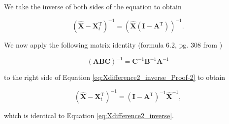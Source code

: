 \documentclass[authoryear,preprint,review,12pt]{elsarticle}
\let\oldhat\hat
\renewcommand{\vec}[1]{\mathbf{#1}}
\renewcommand{\hat}[1]{\oldhat{\mathbf{#1}}}
\begin{document}
\noindent We take the inverse of both sides of the equation to obtain

\begin{equation} \label{eq:Xdifference2_inverse_Proof-2}
	\left(\hat{\vec{X}} - \vec{X}_t^\mathrm{T}\right)^{-1} = \left(\hat{\vec{X}}(\vec{I} - \vec{A}^\mathrm{T})\right)^{-1}.
\end{equation}

\noindent We now apply the following matrix identity (formula 6.2, pg. 308 from \cite{Zwillinger2011})


\begin{equation} \label{eq:Xdifference2_inverse_Proof-3}
	\left(\vec{A}\vec{B}\vec{C}\right)^{-1} = \vec{C}^{-1} \vec{B}^{-1} \vec{A}^{-1}
\end{equation}

\noindent to the right side of Equation \ref{eq:Xdifference2_inverse_Proof-2} to obtain

\begin{equation} \label{eq:Xdifference2_inverse_Proof-4}
	\left(\hat{\vec{X}} - \vec{X}_t^\mathrm{T}\right)^{-1} = (\vec{I} - \vec{A}^{\mathrm{T}})^{-1} \hat{\vec{X}}^{-1},
\end{equation}

\noindent which is identical to Equation \ref{eq:Xdifference2_inverse}.
\end{document}
